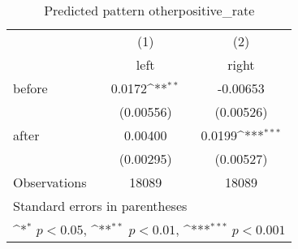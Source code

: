 \begin{table}[htbp]\centering
\def\sym#1{\ifmmode^{#1}\else\(^{#1}\)\fi}
\caption{Predicted pattern otherpositive\_rate}
\begin{tabular}{l*{2}{c}}
\hline\hline
                    &\multicolumn{1}{c}{(1)}&\multicolumn{1}{c}{(2)}\\
                    &\multicolumn{1}{c}{left}&\multicolumn{1}{c}{right}\\
\hline
before              &      0.0172\sym{**} &    -0.00653         \\
                    &   (0.00556)         &   (0.00526)         \\
[1em]
after               &     0.00400         &      0.0199\sym{***}\\
                    &   (0.00295)         &   (0.00527)         \\
\hline
Observations        &       18089         &       18089         \\
\hline\hline
\multicolumn{3}{l}{\footnotesize Standard errors in parentheses}\\
\multicolumn{3}{l}{\footnotesize \sym{*} \(p<0.05\), \sym{**} \(p<0.01\), \sym{***} \(p<0.001\)}\\
\end{tabular}
\end{table}
